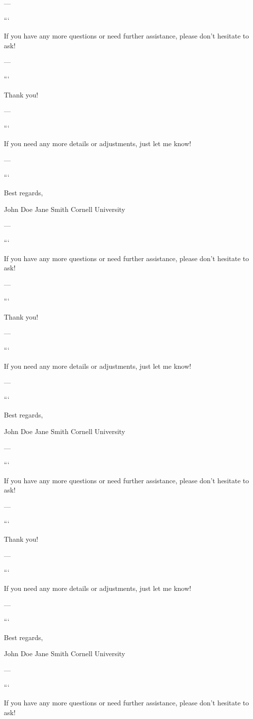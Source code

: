 --- 
 

``` 

If you have any more questions or need further assistance, please don't hesitate to ask! 

--- 
 

``` 

Thank you! 

--- 
 

``` 

If you need any more details or adjustments, just let me know! 

--- 
 

``` 

Best regards, 

John Doe  
Jane Smith  
Cornell University  

--- 
 

``` 

If you have any more questions or need further assistance, please don't hesitate to ask! 

--- 
 

``` 

Thank you! 

--- 
 

``` 

If you need any more details or adjustments, just let me know! 

--- 
 

``` 

Best regards, 

John Doe  
Jane Smith  
Cornell University  

--- 
 

``` 

If you have any more questions or need further assistance, please don't hesitate to ask! 

--- 
 

``` 

Thank you! 

--- 
 

``` 

If you need any more details or adjustments, just let me know! 

--- 
 

``` 

Best regards, 

John Doe  
Jane Smith  
Cornell University  

--- 
 

``` 

If you have any more questions or need further assistance, please don't hesitate to ask! 

